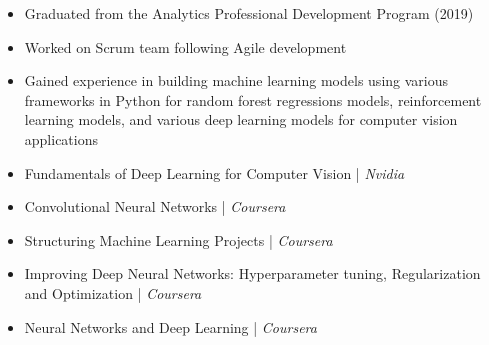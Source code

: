 \documentclass[10pt,a4paper,ragged2e,withhyper]{altacv}
\begin{document}
\begin{paracol}{2}
\divider

\begin{itemize}
\item  Graduated from the Analytics Professional Development Program (2019)
\item  Worked on Scrum team following Agile development
\item  Gained experience in building machine learning models using various frameworks in Python for random forest regressions models, reinforcement learning models, and various deep learning models for computer vision applications
\end{itemize}





\begin{itemize}
\item Fundamentals of Deep Learning for Computer Vision | \textit{Nvidia}
\item Convolutional Neural Networks | \textit{Coursera}
\item Structuring Machine Learning Projects | \textit{Coursera}
\item Improving Deep Neural Networks: Hyperparameter tuning, Regularization and Optimization | \textit{Coursera}
\item Neural Networks and Deep Learning | \textit{Coursera}
\end{itemize}



\end{paracol}
\end{document}
